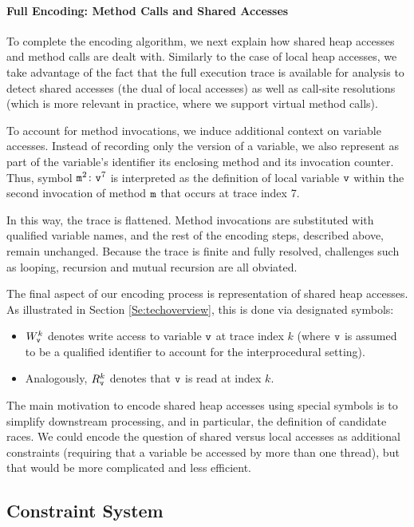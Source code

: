 \paragraph{Full Encoding: Method Calls and Shared Accesses}

To complete the encoding algorithm, we next explain how shared heap accesses and method calls are dealt with. Similarly to the case of local heap accesses, we take advantage of the fact that the full execution trace is available for analysis to detect shared accesses (the dual of local accesses) as well as call-site resolutions (which is more relevant in practice, where we support virtual method calls).

To account for method invocations, we induce additional context on variable accesses. Instead of recording only the version of a variable, we also represent as part of the variable's identifier its enclosing method and its invocation counter. Thus, symbol ${\tt m}^2 \colon {\tt v}^7$ is interpreted as the definition of local variable ${\tt v}$ within the second invocation of method ${\tt m}$ that occurs at trace index 7.

In this way, the trace is flattened. Method invocations are substituted with qualified variable names, and the rest of the encoding steps, described above, remain unchanged. Because the trace is finite and fully resolved, challenges such as looping, recursion and mutual recursion are all obviated.

The final aspect of our encoding process is representation of shared heap accesses. As illustrated in Section \ref{Se:techoverview}, this is done via designated symbols:
\begin{itemize}
	\item $W^{k}_{\tt v}$ denotes write access to variable ${\tt v}$ at trace index $k$ (where ${\tt v}$ is assumed to be a qualified identifier to account for the interprocedural setting).
	\item Analogously, $R^{k}_{\tt v}$ denotes that ${\tt v}$ is read at index $k$.
\end{itemize}

The main motivation to encode shared heap accesses using special symbols is to simplify downstream processing, and in particular, the definition of candidate races. We could encode the question of shared versus local accesses as additional constraints (requiring that a variable be accessed by more than one thread), but that would be more complicated and less efficient.

\subsection{Constraint System}

